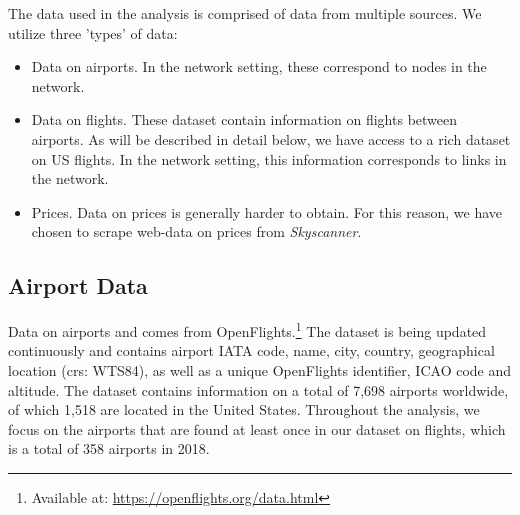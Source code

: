 \label{sec:data}
The data used in the analysis is comprised of data from multiple sources. We utilize three 'types' of data:
\begin{itemize}
    \item Data on airports. In the network setting, these correspond to nodes in the network. 
    \item Data on flights. These dataset contain information on flights between airports. As will be described in detail below, we have access to a rich dataset on US flights. In the network setting, this information corresponds to links in the network.
    \item Prices. Data on prices is generally harder to obtain. For this reason, we have chosen to scrape web-data on prices from \textit{Skyscanner}.
\end{itemize}

\subsection{Airport Data}
Data on airports and comes from OpenFlights.\footnote{Available at: \url{https://openflights.org/data.html}} The dataset is being updated continuously and contains airport IATA code, name, city, country, geographical location (crs: WTS84), as well as a unique OpenFlights identifier, ICAO code and altitude. The dataset contains information on a total of 7,698 airports worldwide, of which 1,518 are located in the United States. Throughout the analysis, we focus on the airports that are found at least once in our dataset on flights, which is a total of 358 airports in 2018.

